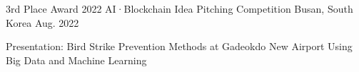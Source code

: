 

\begin{cventries}

  \cventry
  {3rd Place Award} %
  {2022 AI·Blockchain Idea Pitching Competition} %
  {Busan, South Korea} %
  {Aug. 2022} %
  {
    \begin{cvitems} %
      \item {Presentation: Bird Strike Prevention Methods at Gadeokdo New Airport Using Big Data and Machine Learning}
    \end{cvitems}
  }

\end{cventries}
